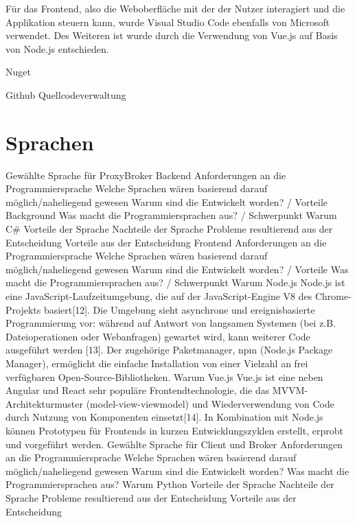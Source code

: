     
    Für das Frontend, also die Weboberfläche mit der der Nutzer interagiert und die Applikation steuern kann, wurde Visual Studio Code ebenfalls von Microsoft verwendet.
    Des Weiteren ist wurde durch die Verwendung von Vue.js %
    auf Basis von Node.js %
    entschieden.

    Nuget %
    
    Github Quellcodeverwaltung %

\section{Sprachen}
    Gewählte Sprache für ProxyBroker
    Backend
        Anforderungen an die Programmiersprache
        Welche Sprachen wären basierend darauf möglich/naheliegend gewesen
            Warum sind die Entwickelt worden? / Vorteile Background
            Was macht die Programmiersprachen aus? / Schwerpunkt
        Warum C\#
            Vorteile der Sprache
            Nachteile der Sprache 
            Probleme resultierend aus der Entscheidung
            Vorteile aus der Entscheidung
    Frontend
        Anforderungen an die Programmiersprache
        Welche Sprachen wären basierend darauf möglich/naheliegend gewesen
            Warum sind die Entwickelt worden? / Vorteile
            Was macht die Programmiersprachen aus? / Schwerpunkt
        Warum Node.js
            Node.js ist eine JavaScript-Laufzeitumgebung, die auf der JavaScript-Engine V8 des Chrome-Projekts basiert[12]. Die Umgebung sieht asynchrone und ereignisbasierte Programmierung vor: während auf Antwort von langsamen Systemen (bei z.B. Dateioperationen oder Webanfragen) gewartet wird, kann weiterer Code ausgeführt werden [13]. Der zugehörige Paketmanager, npm (Node.js Package Manager), ermöglicht die einfache Installation von einer Vielzahl an frei verfügbaren Open-Source-Bibliotheken. 
        Warum Vue.js
            Vue.js ist eine neben Angular und React sehr populäre Frontendtechnologie, die das MVVM-Architekturmuster (model-view-viewmodel) und Wiederverwendung von Code durch Nutzung von Komponenten einsetzt[14]. In Kombination mit Node.js können Prototypen für Frontends in kurzen Entwicklungszyklen erstellt, erprobt und vorgeführt werden.
    Gewählte Sprache für Client und Broker
        Anforderungen an die Programmiersprache
        Welche Sprachen wären basierend darauf möglich/naheliegend gewesen
            Warum sind die Entwickelt worden? 
            Was macht die Programmiersprachen aus?
        Warum Python
            Vorteile der Sprache
            Nachteile der Sprache 
            Probleme resultierend aus der Entscheidung
            Vorteile aus der Entscheidung
     
